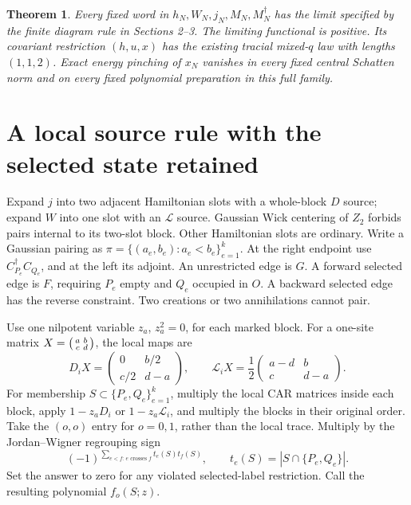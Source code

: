 \documentclass[11pt]{article}
\newtheorem{theorem}{Theorem}
\begin{document}
\begin{theorem}\label{main}
Every fixed word in $h_N,W_N,j_N,M_N,M_N^\dagger$ has the limit
specified by the finite diagram rule in Sections 2--3. The limiting
functional is positive. Its covariant restriction $(h,u,x)$ has the
existing tracial mixed-$q$ law with lengths $(1,1,2)$. Exact energy
pinching of $x_N$ vanishes in every fixed central Schatten norm and
on every fixed polynomial preparation in this full family.
\end{theorem}

\newpage
\section{A local source rule with the selected state retained}
Expand $j$ into two adjacent Hamiltonian slots with a whole-block $D$
source; expand $W$ into one slot with an $\mathcal L$ source. Gaussian
Wick centering of $Z_2$ forbids pairs internal to its two-slot block.
Other Hamiltonian slots are ordinary. Write a Gaussian pairing as
$\pi=\{(a_e,b_e):a_e<b_e\}_{e=1}^k$. At the right endpoint use
$C_{P_e}^\dagger C_{Q_e}$, and at the left its adjoint. An unrestricted
edge is $G$. A forward selected edge is $F$, requiring $P_e$ empty and
$Q_e$ occupied in $O$. A backward selected edge has the reverse
constraint. Two creations or two annihilations cannot pair.

Use one nilpotent variable $z_a$, $z_a^2=0$, for each marked block.
For a one-site matrix $X=\begin{psmallmatrix}a&b\\c&d\end{psmallmatrix}$,
the local maps are
\begin{equation}\label{localmaps}
 D_iX=\begin{pmatrix}0&b/2\\c/2&d-a\end{pmatrix},\qquad
 \mathcal L_iX=\frac12\begin{pmatrix}a-d&b\\c&d-a\end{pmatrix}.
\end{equation}
For membership $S\subset\{P_e,Q_e\}_{e=1}^k$, multiply the local
CAR matrices inside each block, apply $1-z_aD_i$ or
$1-z_a\mathcal L_i$, and multiply the blocks in their original order.
Take the $(o,o)$ entry for $o=0,1$, rather than the local trace. Multiply
by the Jordan--Wigner regrouping sign
\begin{equation}\label{sign}
 (-1)^{\sum_{e<f:\,e\text{ crosses }f} t_e(S)t_f(S)},\qquad
 t_e(S)=|S\cap\{P_e,Q_e\}|.
\end{equation}
Set the answer to zero for any violated selected-label restriction.
Call the resulting polynomial $f_o(S;z)$.
\end{document}
